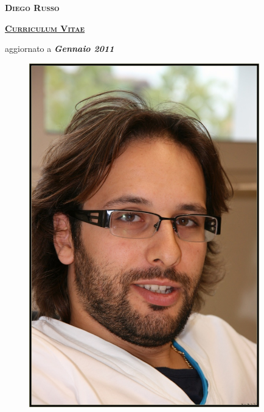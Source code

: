 \documentclass[totpages,helvetica,openbib,italian]{europecv}
\begin{document}
    \begin{center}
        \hspace{1pt}
        \vspace{2cm}
    
        {\scshape \textbf{\Huge Diego Russo}}
    
        \vspace{1cm}
    
        {\scshape \textbf{\Large \underline{Curriculum Vitae}}}
    
        \vspace{0.25cm}
    
        {\large aggiornato a \emph{\textbf{Gennaio 2011}}}
        
        \vspace{2cm}
        
        \begin{figure}[htbp] 
            \begin{center} 
                \includegraphics[width=10cm]{../images/io.jpg}
            \end{center} 
        \end{figure}
        
    \end{center}
\pagebreak
{}
\end{document}
